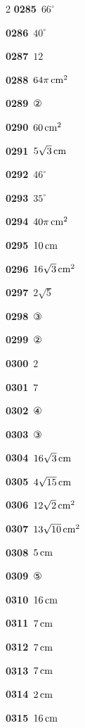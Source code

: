 \documentclass[10pt,a4paper]{article}
\begin{document}
\begin{multicols}{2}
\noindent\textbf{0285}\ $66^\circ$\par
\noindent\textbf{0286}\ $40^\circ$\par
\noindent\textbf{0287}\ $12$\par
\noindent\textbf{0288}\ $64\pi\mkern3mu \mathrm{cm}^2$\par
\noindent\textbf{0289}\ ②\par
\noindent\textbf{0290}\ $60\mkern3mu \mathrm{cm}^2$\par
\noindent\textbf{0291}\ $5\sqrt{3}\mkern3mu \mathrm{cm}$\par
\noindent\textbf{0292}\ $46^\circ$\par
\noindent\textbf{0293}\ $35^\circ$\par
\noindent\textbf{0294}\ $40\pi\mkern3mu \mathrm{cm}^2$\par
\noindent\textbf{0295}\ $10\mkern3mu \mathrm{cm}$\par
\noindent\textbf{0296}\ $16\sqrt{3}\mkern3mu \mathrm{cm}^2$\par
\noindent\textbf{0297}\ $2\sqrt{5}$\par
\noindent\textbf{0298}\ ③\par
\noindent\textbf{0299}\ ②\par
\noindent\textbf{0300}\ $2$\par
\noindent\textbf{0301}\ $7$\par
\noindent\textbf{0302}\ ④\par
\noindent\textbf{0303}\ ③\par
\noindent\textbf{0304}\ $16\sqrt{3}\mkern3mu \mathrm{cm}$\par
\noindent\textbf{0305}\ $4\sqrt{15}\mkern3mu \mathrm{cm}$\par
\noindent\textbf{0306}\ $12\sqrt{2}\mkern3mu \mathrm{cm}^2$\par
\noindent\textbf{0307}\ $13\sqrt{10}\mkern3mu \mathrm{cm}^2$\par
\noindent\textbf{0308}\ $5\mkern3mu \mathrm{cm}$\par
\noindent\textbf{0309}\ ⑤\par
\noindent\textbf{0310}\ $16\mkern3mu \mathrm{cm}$\par
\noindent\textbf{0311}\ $7\mkern3mu \mathrm{cm}$\par
\noindent\textbf{0312}\ $7\mkern3mu \mathrm{cm}$\par
\noindent\textbf{0313}\ $7\mkern3mu \mathrm{cm}$\par
\noindent\textbf{0314}\ $2\mkern3mu \mathrm{cm}$\par
\noindent\textbf{0315}\ $16\mkern3mu \mathrm{cm}$\par

\end{multicols}
\end{document}
